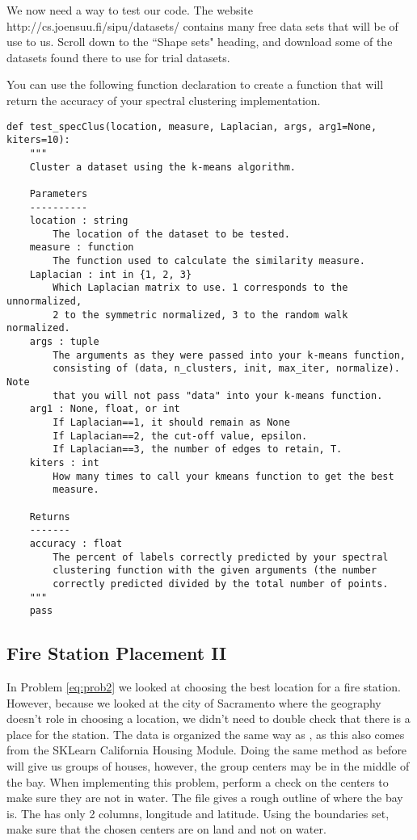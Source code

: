 We now need a way to test our code.  The website http://cs.joensuu.fi/sipu/datasets/ contains many free data sets that will be of use to us.  Scroll down to the ``Shape sets" heading, and download some of the datasets found there to use for trial datasets.

You can use the following function declaration to create a function that will return the accuracy of your spectral clustering implementation.
\begin{lstlisting}
def test_specClus(location, measure, Laplacian, args, arg1=None, kiters=10):
    """
    Cluster a dataset using the k-means algorithm.

    Parameters
    ----------
    location : string
        The location of the dataset to be tested.
    measure : function
        The function used to calculate the similarity measure.
    Laplacian : int in {1, 2, 3}
        Which Laplacian matrix to use. 1 corresponds to the unnormalized,
        2 to the symmetric normalized, 3 to the random walk normalized.
    args : tuple
        The arguments as they were passed into your k-means function,
        consisting of (data, n_clusters, init, max_iter, normalize). Note
        that you will not pass "data" into your k-means function.
    arg1 : None, float, or int
        If Laplacian==1, it should remain as None
        If Laplacian==2, the cut-off value, epsilon.
        If Laplacian==3, the number of edges to retain, T.
    kiters : int
        How many times to call your kmeans function to get the best
        measure.

    Returns
    -------
    accuracy : float
        The percent of labels correctly predicted by your spectral
        clustering function with the given arguments (the number
        correctly predicted divided by the total number of points.
    """
    pass
\end{lstlisting}

\subsection*{Fire Station Placement II}
In Problem \ref{eq:prob2} we looked at choosing the best location for a fire station.
However, because we looked at the city of Sacramento where the geography doesn't role in choosing a location, we didn't need to double check that there is a place for the station.
The  data is organized the same way as , as this also comes from the SKLearn California Housing Module.
Doing the same method as before will give us groups of houses, however, the group centers may be in the middle of the bay.
When implementing this problem, perform a check on the centers to make sure they are not in water.
The file  gives a rough outline of where the bay is.
The  has only 2 columns, longitude and latitude.
Using the boundaries set, make sure that the chosen centers are on land and not on water.

